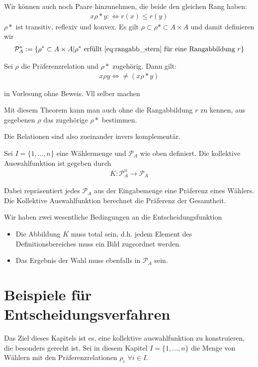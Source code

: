 Wir können auch noch Paare hinzunehmen, die beide den gleichen Rang haben: 
\begin{align}
	\label{eq:rangabb_stern}
	x \rho* y : \Leftrightarrow r(x) \leq r(y)
\end{align}
$\rho*$ ist transitiv, reflexiv und konvex. Es gilt $\rho \subset \rho* \subset A \times A$
und damit definieren wir 
\begin{align*}
	\mathcal{P}_A^*:=\{ \rho^* \subset A \times A| \rho^* \text{ erfüllt \eqref{eq:rangabb_stern} für eine Rangabbildung } r \}
	\end{align*}

\begin{thm}
	Sei $\rho$ die Präferenzrelation und $\rho*$ zugehörig. Dann gilt: 
	\begin{align*}
		x \rho y \Leftrightarrow \neq (x \rho* y)
	\end{align*}
\end{thm}
\begin{noti}
	in Vorlesung ohne Beweis. Vll selber machen
\end{noti}
Mit diesem Theorem kann man auch ohne die Rangabbildung $r$ zu kennen, aus gegebenen $\rho$ das zugehörige $\rho*$ bestimmen.  
 
Die Relationen sind also zueinander invers komplementär. 

\begin{defi}
	Sei $I=\{1, \dots, n\}$ eine Wählermenge und $\mathcal{P}_A$ wie oben definiert. Die kollektive Auswahlfunktion ist gegeben durch
	\begin{align*}
		K: \mathcal{P}_A^n \rightarrow \mathcal{P}_A
	\end{align*}
\end{defi}
Dabei repräsentiert jedes $\mathcal{P}_A$ aus der Eingabemenge eine Präferenz eines Wählers. Die Kollektive Auswahlfunktion berechnet die Präferenz der Gesamtheit. 

Wir haben zwei wesentliche Bedingungen an die Entscheidungsfunktion
\begin{itemize}
	\item Die Abbildung $K$ muss total sein, d.h. jedem Element des Definitionsbereiches muss ein Bild zugeordnet werden.
	\item Das Ergebnis der Wahl muss ebenfalls in $\mathcal{P}_A$ sein. 
\end{itemize} 

\section{Beispiele für Entscheidungsverfahren}
Das Ziel dieses Kapitels ist es, eine kollektive auswahlfunktion zu konstruieren, die besonders gerecht ist. 
Sei in diesem Kapitel $I=\{1, \dots, n\}$ die Menge von Wählern mit den Präferenzrelationen $\rho_i$ $\forall i \in I$. 

